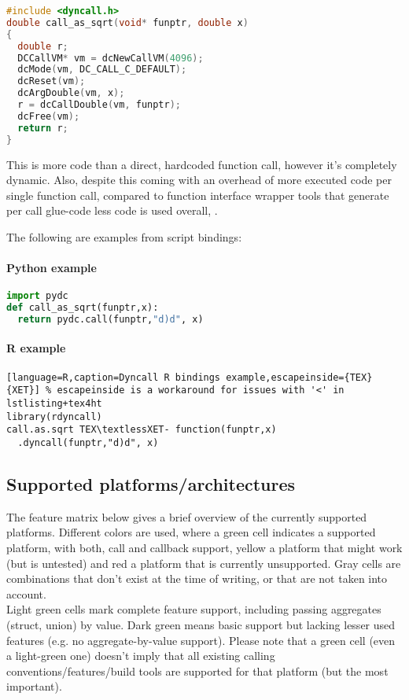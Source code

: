 \begin{lstlisting}[language=c,caption=Dyncall C library example]
#include <dyncall.h>
double call_as_sqrt(void* funptr, double x)
{
  double r;
  DCCallVM* vm = dcNewCallVM(4096);
  dcMode(vm, DC_CALL_C_DEFAULT);
  dcReset(vm);
  dcArgDouble(vm, x);  
  r = dcCallDouble(vm, funptr);
  dcFree(vm);
  return r;
}
\end{lstlisting}

This is more code than a direct, hardcoded function call, however it's completely dynamic.
Also, despite this coming with an overhead of more executed code per single function call,
compared to function interface wrapper tools that generate per call glue-code less code is
used overall, . %

The following are examples from script bindings:

\paragraph{Python example}

\begin{lstlisting}[language=python,caption=Dyncall Python bindings example]
import pydc
def call_as_sqrt(funptr,x):
  return pydc.call(funptr,"d)d", x)
\end{lstlisting}


\paragraph{R example}

\begin{lstlisting}[language=R,caption=Dyncall R bindings example,escapeinside={TEX}{XET}] % escapeinside is a workaround for issues with '<' in lstlisting+tex4ht
library(rdyncall)
call.as.sqrt TEX\textlessXET- function(funptr,x)
  .dyncall(funptr,"d)d", x)
\end{lstlisting}


\pagebreak

\subsection{Supported platforms/architectures}

The feature matrix below gives a brief overview of the currently supported
platforms. Different colors are used, where a green cell indicates a supported
platform, with both, call and callback support, yellow a platform that might
work (but is untested) and red a platform that is currently unsupported. Gray
cells are combinations that don't exist at the time of writing, or that are not
taken into account.\\
Light green cells mark complete feature support, including passing aggregates
(struct, union) by value. Dark green means basic support but lacking lesser
used features (e.g. no aggregate-by-value support). Please note that a green
cell (even a light-green one) doesn't imply that all existing calling
conventions/features/build tools are supported for that platform (but the most
important).


